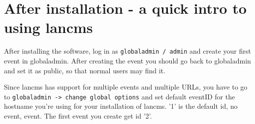 \chapter{After installation - a quick intro to using lancms}

After installing the software, log in as \lstinline!globaladmin / admin! and
create your first event in globaladmin. After creating the event you should go
back to globaladmin and set it as public, so that normal users may find it.

Since lancms has support for multiple events and multiple URLs, you have to go
to \lstinline!globaladmin -> change global options! and set default eventID
for the hostname you're using for your installation of lancms.
'1' is the default id, no event, event. The first event you create get id '2'.
